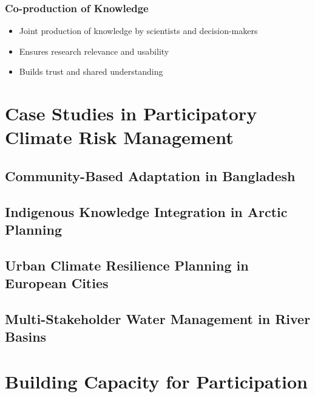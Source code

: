 \documentclass[
  letterpaper,
  DIV=11,
  numbers=noendperiod]{scrreprt}
\providecommand{\tightlist}{%
  \setlength{\itemsep}{0pt}\setlength{\parskip}{0pt}}
\begin{document}
\subsubsection{Co-production of
Knowledge}\label{co-production-of-knowledge}

\begin{itemize}
\tightlist
\item
  Joint production of knowledge by scientists and decision-makers
\item
  Ensures research relevance and usability
\item
  Builds trust and shared understanding
\end{itemize}

\section{Case Studies in Participatory Climate Risk
Management}\label{case-studies-in-participatory-climate-risk-management}

\subsection{Community-Based Adaptation in
Bangladesh}\label{community-based-adaptation-in-bangladesh}

\subsection{Indigenous Knowledge Integration in Arctic
Planning}\label{indigenous-knowledge-integration-in-arctic-planning}

\subsection{Urban Climate Resilience Planning in European
Cities}\label{urban-climate-resilience-planning-in-european-cities}

\subsection{Multi-Stakeholder Water Management in River
Basins}\label{multi-stakeholder-water-management-in-river-basins}

\section{Building Capacity for
Participation}\label{building-capacity-for-participation}
\end{document}

